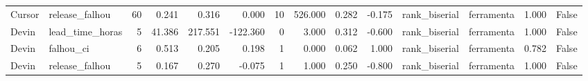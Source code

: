\begin{tabular}{llrrrrrrrrllrr}
Cursor & release_falhou & 60 & 0.241 & 0.316 & 0.000 & 10 & 526.000 & 0.282 & -0.175 & rank_biserial & ferramenta & 1.000 & False \\
Devin & lead_time_horas & 5 & 41.386 & 217.551 & -122.360 & 0 & 3.000 & 0.312 & -0.600 & rank_biserial & ferramenta & 1.000 & False \\
Devin & falhou_ci & 6 & 0.513 & 0.205 & 0.198 & 1 & 0.000 & 0.062 & 1.000 & rank_biserial & ferramenta & 0.782 & False \\
Devin & release_falhou & 5 & 0.167 & 0.270 & -0.075 & 1 & 1.000 & 0.250 & -0.800 & rank_biserial & ferramenta & 1.000 & False \\
\bottomrule
\end{tabular}
